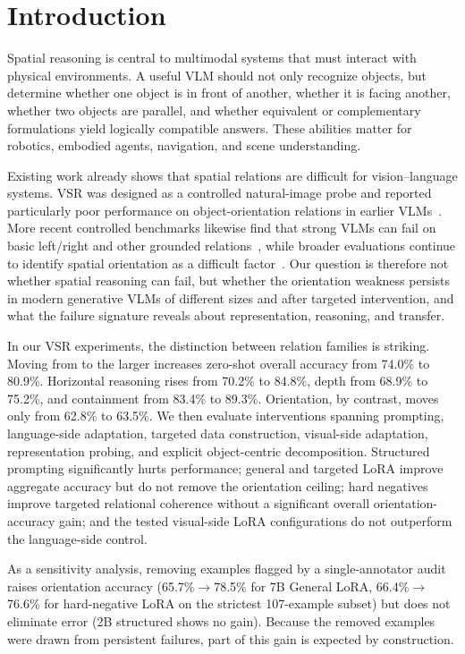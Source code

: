 \section{Introduction}
Spatial reasoning is central to multimodal systems that must interact with physical environments. A useful VLM should not only recognize objects, but determine whether one object is in front of another, whether it is facing another, whether two objects are parallel, and whether equivalent or complementary formulations yield logically compatible answers. These abilities matter for robotics, embodied agents, navigation, and scene understanding.

Existing work already shows that spatial relations are difficult for vision--language systems. VSR was designed as a controlled natural-image probe and reported particularly poor performance on object-orientation relations in earlier VLMs~\cite{liu2023vsr}. More recent controlled benchmarks likewise find that strong VLMs can fail on basic left/right and other grounded relations~\cite{kamath2023whatsup,rajabi2024gsrbench}, while broader evaluations continue to identify spatial orientation as a difficult factor~\cite{wang2025site}. Our question is therefore not whether spatial reasoning can fail, but whether the orientation weakness persists in modern generative VLMs of different sizes and after targeted intervention, and what the failure signature reveals about representation, reasoning, and transfer.

In our VSR experiments, the distinction between relation families is striking. Moving from \modelsmall{} to the larger \modellarge{} increases zero-shot overall accuracy from 74.0\% to 80.9\%. Horizontal reasoning rises from 70.2\% to 84.8\%, depth from 68.9\% to 75.2\%, and containment from 83.4\% to 89.3\%. Orientation, by contrast, moves only from 62.8\% to 63.5\%. We then evaluate interventions spanning prompting, language-side adaptation, targeted data construction, visual-side adaptation, representation probing, and explicit object-centric decomposition. Structured prompting significantly hurts performance; general and targeted LoRA improve aggregate accuracy but do not remove the orientation ceiling; hard negatives improve targeted relational coherence without a significant overall orientation-accuracy gain; and the tested visual-side LoRA configurations do not outperform the language-side control.

As a sensitivity analysis, removing examples flagged by a single-annotator audit raises orientation accuracy (65.7\%$\rightarrow$78.5\% for 7B General LoRA, 66.4\%$\rightarrow$76.6\% for hard-negative LoRA on the strictest 107-example subset) but does not eliminate error (2B structured shows no gain). Because the removed examples were drawn from persistent failures, part of this gain is expected by construction.

